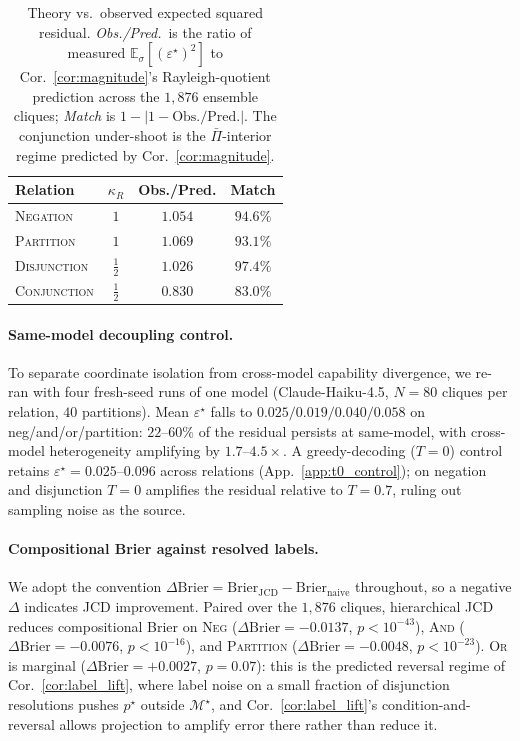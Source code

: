 \documentclass{article}
\theoremstyle{plain}
\theoremstyle{definition}
\theoremstyle{remark}
\newcommand{\Mjoint}{\mathcal{M}^{\star}}
\newcommand{\E}{\mathbb{E}}
\newcommand{\eps}{\varepsilon}
\begin{document}
\begin{table}[h]
\centering
\small
\begin{tabular}{lccc}
\toprule
Relation & $\kappa_R$ & Obs./Pred. & Match \\
\midrule
\textsc{Negation}    & $1$            & $1.054$ & $94.6\%$ \\
\textsc{Partition}   & $1$            & $1.069$ & $93.1\%$ \\
\textsc{Disjunction} & $\tfrac{1}{2}$ & $1.026$ & $97.4\%$ \\
\textsc{Conjunction} & $\tfrac{1}{2}$ & $0.830$ & $83.0\%$ \\
\bottomrule
\end{tabular}
\caption{Theory vs.\ observed expected squared residual.
\emph{Obs./Pred.}\ is the ratio of measured
$\E_\sigma[(\eps^\star)^2]$ to Cor.~\ref{cor:magnitude}'s
Rayleigh-quotient prediction across the $1{,}876$ ensemble cliques;
\emph{Match} is $1-|1-\text{Obs./Pred.}|$. The conjunction
under-shoot is the $\bar\Pi$-interior regime predicted by
Cor.~\ref{cor:magnitude}.}
\label{tab:theory_obs}
\end{table}

\paragraph{Same-model decoupling control.}
To separate coordinate isolation from cross-model capability
divergence, we re-ran with four fresh-seed runs of one model
(Claude-Haiku-4.5, $N{=}80$ cliques per relation, $40$
partitions). Mean $\eps^\star$ falls to $0.025/0.019/0.040/0.058$
on neg/and/or/partition: $22$--$60\%$ of the residual persists at
same-model, with cross-model heterogeneity amplifying by
$1.7$--$4.5\times$. A greedy-decoding ($T{=}0$) control retains
$\eps^\star = 0.025$--$0.096$ across relations
(App.~\ref{app:t0_control}); on negation and disjunction $T{=}0$
amplifies the residual relative to $T{=}0.7$, ruling out sampling
noise as the source.

\paragraph{Compositional Brier against resolved labels.}
We adopt the convention $\Delta\mathrm{Brier} = \mathrm{Brier}_{\mathrm{JCD}} - \mathrm{Brier}_{\mathrm{naive}}$
throughout, so a negative $\Delta$ indicates JCD improvement.
Paired over the $1{,}876$ cliques, hierarchical JCD reduces
compositional Brier on \textsc{Neg}
($\Delta\mathrm{Brier}{=}-0.0137$, $p{<}10^{-43}$), \textsc{And}
($\Delta\mathrm{Brier}{=}-0.0076$, $p{<}10^{-16}$), and \textsc{Partition}
($\Delta\mathrm{Brier}{=}-0.0048$, $p{<}10^{-23}$). \textsc{Or} is
marginal ($\Delta\mathrm{Brier}{=}{+}0.0027$, $p{=}0.07$): this is
the predicted reversal regime of Cor.~\ref{cor:label_lift}, where
label noise on a small fraction of disjunction resolutions pushes
$p^\star$ outside $\Mjoint$, and Cor.~\ref{cor:label_lift}'s
condition-and-reversal allows projection to amplify error there
rather than reduce it.
\end{document}

